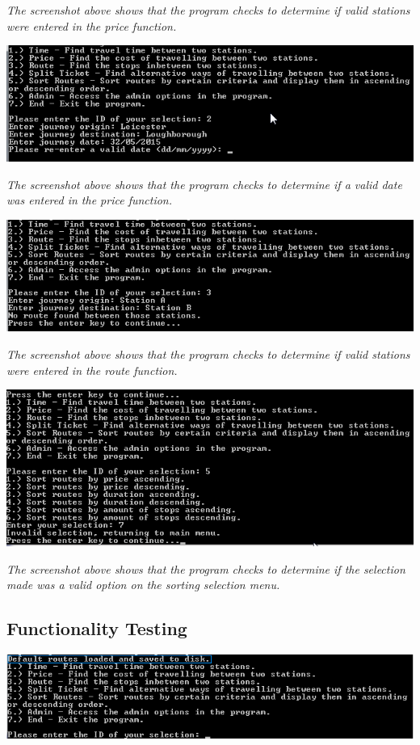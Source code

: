 \documentclass[10pt, a4paper]{article}
\begin{document}
\textit{The screenshot above shows that the program checks to determine if valid stations were entered in the price function.}

\includegraphics{Validation5.png}

\textit{The screenshot above shows that the program checks to determine if a valid date was entered in the price function.}

\includegraphics{Validation6.png}

\textit{The screenshot above shows that the program checks to determine if valid stations were entered in the route function.}

\includegraphics{Validation7.png}

\textit{The screenshot above shows that the program checks to determine if the selection made was a valid option on the sorting selection menu.}

\subsection{Functionality Testing}

\includegraphics{Functionality1.png}
\end{document}
